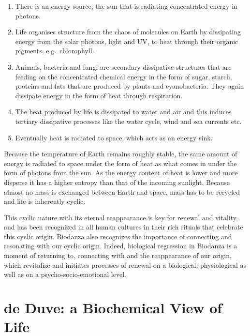 \documentclass[
  11pt,
]{book}
\begin{document}
\begin{enumerate}
\def\labelenumi{\arabic{enumi}.}
\item
  There is an energy source, the sun that is radiating concentrated energy in photons.
\item
  Life organises structure from the chaos of molecules on Earth by dissipating energy from the solar photons, light and UV, to heat through their organic pigments, e.g.~chlorophyll.
\item
  Animals, bacteria and fungi are secondary dissipative structures that are feeding on the concentrated chemical energy in the form of sugar, starch, proteins and fats that are produced by plants and cyanobacteria. They again dissipate energy in the form of heat through respiration.
\item
  The heat produced by life is dissipated to water and air and this induces tertiary dissipative processes like the water cycle, wind and sea currents etc.
\item
  Eventually heat is radiated to space, which acts as an energy sink.
\end{enumerate}

Because the temperature of Earth remains roughly stable, the same amount of energy is radiated to space under the form of heat as what comes in under the form of photons from the sun. As the energy content of heat is lower and more disperse it has a higher entropy than that of the incoming sunlight.
Because almost no mass is exchanged between Earth and space, mass has to be recycled and life is inherently cyclic.

This cyclic nature with its eternal reappearance is key for renewal and vitality, and has been recognized in all human cultures in their rich rituals that celebrate this cyclic origin. Biodanza also recognizes the importance of connecting and resonating with our cyclic origin. Indeed, biological regression in Biodanza is a moment of returning to, connecting with and the reappearance of our origin, which revitalize and initiates processes of renewal on a biological, physiological as well as on a psycho-socio-emotional level.

\newpage

\hypertarget{de-duve-a-biochemical-view-of-life}{%
\section{de Duve: a Biochemical View of Life}\label{de-duve-a-biochemical-view-of-life}}
\end{document}
